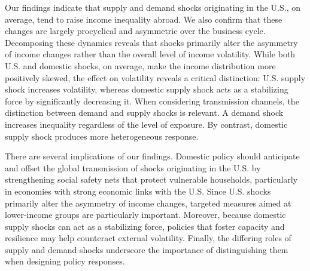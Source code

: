 \documentclass[12pt, a4paper]{article}
\begin{document}
Our findings indicate that supply and demand shocks originating in the U.S., on average, tend to raise income inequality abroad. We also confirm that these changes are largely procyclical and asymmetric over the business cycle. Decomposing these dynamics reveals that shocks primarily alter the asymmetry of income changes rather than the overall level of income volatility. While both U.S. and domestic shocks, on average, make the income distribution more positively skewed, the effect on volatility reveals a critical distinction: U.S. supply shock increases volatility, whereas domestic supply shock acts as a stabilizing force by significantly decreasing it. When considering transmission channels, the distinction between demand and supply shocks is relevant. A demand shock increases inequality regardless of the level of exposure. By contrast, domestic supply shock produces more heterogeneous response.

There are several implications of our findings. Domestic policy should anticipate and offset the global transmission of shocks originating in the U.S. by strengthening social safety nets that protect vulnerable households, particularly in economies with strong economic links with the U.S. Since U.S. shocks primarily alter the asymmetry of income changes, targeted measures aimed at lower-income groups are particularly important. Moreover, because domestic supply shocks can act as a stabilizing force, policies that foster capacity and resilience may help counteract external volatility. Finally, the differing roles of supply and demand shocks underscore the importance of distinguishing them when designing policy responses.
\end{document}
